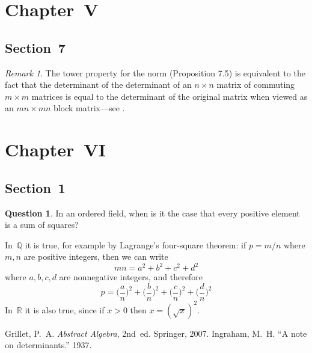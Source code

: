 \documentclass[letterpaper,12pt]{article}
\newcommand{\Q}{\mathbb{Q}}
\newcommand{\R}{\mathbb{R}}
\theoremstyle{definition}
\newtheorem*{quest}{Question}
\theoremstyle{remark}
\newtheorem*{rmk}{Remark}
\theoremstyle{plain}
\begin{document}
\section*{Chapter~V}
\subsection*{Section~7}
\begin{rmk}
The tower property for the norm (Proposition 7.5) is equivalent to the fact that the determinant of the determinant of an \(n\times n\) matrix of commuting \(m\times m\) matrices is equal to the determinant of the original matrix when viewed as an \(mn\times mn\) block matrix---see \cite{ingraham}.
\end{rmk}

\section*{Chapter~VI}
\subsection*{Section~1}
\begin{quest}
In an ordered field, when is it the case that every positive element is a sum of squares?
\end{quest}
\noindent In~\(\Q\) it is true, for example by Lagrange's four-square theorem: if \(p=m/n\) where \(m,n\) are positive integers, then we can write
\[mn=a^2+b^2+c^2+d^2\]
where \(a,b,c,d\) are nonnegative integers, and therefore
\[p=\Biggl(\frac{a}{n}\Biggr)^2+\Biggl(\frac{b}{n}\Biggr)^2+\Biggl(\frac{c}{n}\Biggr)^2+\Biggl(\frac{d}{n}\Biggr)^2\]
In~\(\R\) it is also true, since if \(x>0\) then \(x=(\sqrt{x})^2\).

\begin{thebibliography}{0}
 Grillet, P.~A. \textit{Abstract Algebra}, 2nd~ed. Springer, 2007.
 Ingraham, M.~H. ``A note on determinants.'' 1937.
\end{thebibliography}
\end{document}
